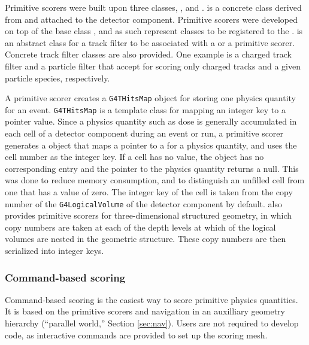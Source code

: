 Primitive scorers were built upon three classes, 
,
  and
.
is a concrete class
derived from  and attached to the
detector component.  Primitive scorers were developed on top of the base class
, and as such represent classes to be registered to
the .   is an abstract
class for a track filter to be associated with a
 or a primitive scorer.
Concrete track filter classes are also provided.  One example is a charged track
filter and a particle filter that accept for scoring only charged tracks and a
given particle species, respectively.

A primitive scorer creates a \texttt{G4THitsMap} object for storing one physics
quantity for an event.  \texttt{G4THitsMap} is a template class for mapping an 
integer key to a pointer value.  Since a physics quantity such as dose is 
generally accumulated in each cell of a detector component during an event or 
run, a primitive scorer generates a  object that 
maps a pointer to a  for a physics quantity, and uses the cell
number as the integer key.  If a cell has no value, the  
object has no corresponding entry and the pointer to the physics quantity 
returns a null.  This was done to reduce memory consumption, and to distinguish
an unfilled cell from one that has a value of zero.  The integer key of the cell
is taken from the copy number of the \texttt{G4LogicalVolume} of the detector 
component by default.  \Gfour{} also provides primitive scorers for 
three-dimensional structured geometry, in which copy numbers are taken at each 
of the depth levels at which of the logical volumes are nested in the geometric
structure.  These copy numbers are then serialized into integer keys. 

\subsubsection{Command-based scoring}

Command-based scoring is the easiest way to score primitive physics quantities.
It is based on the primitive scorers and navigation in an auxilliary geometry 
hierarchy (``parallel world,'' Section \ref{sec:nav}).  Users are not 
required to develop code, as interactive commands are provided to set up the 
scoring mesh.

